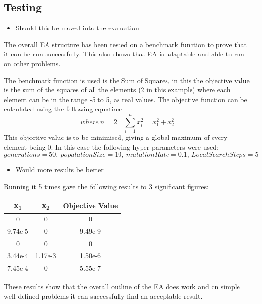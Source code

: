 \documentclass[a4paper]{article}
\begin{document}
\subsection{Testing}
\begin{itemize}
	\item Should this be moved into the evaluation
\end{itemize}
\par
The overall EA structure has been tested on a benchmark function to prove that it can be run successfully.
This also shows that EA is adaptable and able to run on other problems.
\par
The benchmark function is used is the Sum of Squares, in this the objective value is the sum of the squares of all the elements (2 in this example) where each element can be in the range -5 to 5, as real values.
The objective function can be calculated using the following equation:
\begin{equation}
    where\ n = 2\quad \sum_{i=1}^{n} x_i^2 = x_1^2 + x_2^2
\end{equation}
This objective value is to be minimised, giving a global maximum of every element being 0.
In this case the following hyper parameters were used:
\begin{equation}
    generations = 50,\ populationSize = 10,\ mutationRate = 0.1,\ LocalSearchSteps = 5
\end{equation}
\begin{itemize}
	\item Would more results be better
\end{itemize}
Running it 5 times gave the following results to 3 significant figures:
\begin{center}
    \begin{tabular}{ c c | c }
        x\textsubscript{1} & x\textsubscript{2} & Objective Value \\
        \hline
        0 & 0 & 0 \\
        9.74e-5 & 0 & 9.49e-9 \\
        0 & 0 & 0 \\
        3.44e-4 & 1.17e-3 & 1.50e-6 \\
        7.45e-4 & 0 & 5.55e-7 \\
    \end{tabular}
\end{center}
\par
These results show that the overall outline of the EA does work and on simple well defined problems it can successfully find an acceptable result.
\end{document}
